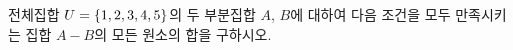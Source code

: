 전체집합 $U=\{1{,}\mkern3mu\mathopen{}2{,}\mkern3mu\mathopen{}3{,}\mkern3mu\mathopen{}4{,}\mkern3mu\mathopen{}5\}$의 두 부분집합 $A$, $B$에 대하여 다음 조건을 모두 만족시키는 집합 $A-B$의 모든 원소의 합을 구하시오.
